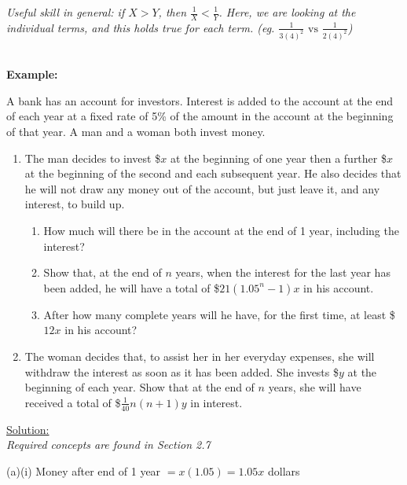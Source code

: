 \documentclass[12pt, a4paper, titlepage]{article}
\begin{document}
\emph{Useful skill in general: if $X > Y$, then $\frac{1}{X} < \frac{1}{Y}$. Here, we are looking at the individual terms, and this holds true for each term. (eg. $\frac{1}{3(4)^2} \text{ vs } \frac{1}{2(4)^2}$)}

\textbf{\\ Example:}

A bank has an account for investors. Interest is added to the account at the end of each year at a fixed rate of 5\% of the amount in the account at the beginning of that year. A man and a woman both invest money.

\begin{enumerate}[label=(\alph*)]
    \item The man decides to invest \$$x$ at the beginning of one year then a further \$$x$ at the beginning of the second and each subsequent year. He also decides that he will not draw any money out of the account, but just leave it, and any interest, to build up.

    \begin{enumerate}[label=(\roman*)]
        \item How much will there be in the account at the end of 1 year, including the interest?
        \item Show that, at the end of $n$ years, when the interest for the last year has been added, he will have a total of \$$21(1.05^n - 1)x$ in his account.
        \item After how many complete years will he have, for the first time, at least \$$12x$ in his account?
    \end{enumerate}

    \item The woman decides that, to assist her in her everyday expenses, she will withdraw the interest as soon as it has been added. She invests \$$y$ at the beginning of each year. Show that at the end of $n$ years, she will have received a total of \$$\frac{1}{40}n(n + 1)y$ in interest.
\end{enumerate}

\begin{flushright}
\end{flushright}

\underline{Solution:} \\
\emph{Required concepts are found in Section 2.7}

(a)(i)
Money after end of 1 year $= x(1.05) = 1.05x$ dollars
\end{document}
